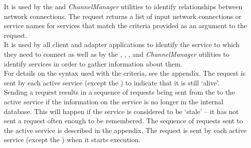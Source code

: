 It is used by the  and \emph{ChannelManager} utilities to
identify relationships between \yarp{} network connections.
The  request returns a list of
input \yarp{} network connections or service names for services that match the criteria
provided as an argument to the request.\\

It is used by all client and adapter applications to identify the service to which they
need to connect as well as by the ,
, ,
 and \emph{ChannelManager} utilities to identify services
in order to gather information about them.\\

For details on the syntax used with the criteria, see the 
 appendix.
The  request is sent by each
active service (except the ) to indicate
that it is still `alive'.\\

Sending a  request results in a
sequence of requests being sent from the 
to the active service if the information on the service is no longer in the internal
database.
This will happen if the service is considered to be `stale' -- it has not sent a
 request often enough to be
remembered.
The sequence of requests sent to the active service is described in the 
 appendix.
The  request is sent by each
active service (except the ) when it
starts execution.\\

